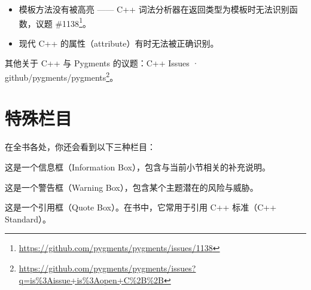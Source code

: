 \begin{itemize}
\item 模板方法没有被高亮 —— C++ 词法分析器在返回类型为模板时无法识别函数，议题 \#1138\footnote{\url{https://github.com/pygments/pygments/issues/1138}}。
\item 现代 C++ 的属性（attribute）有时无法被正确识别。
\end{itemize}

其他关于 C++ 与 Pygments 的议题：C++ Issues · github/pygments/pygments\footnote{\url{https://github.com/pygments/pygments/issues?q=is\%3Aissue+is\%3Aopen+C\%2B\%2B}}。

\section{特殊栏目}

在全书各处，你还会看到以下三种栏目：

\begin{myInfoBox}
这是一个信息框（Information Box），包含与当前小节相关的补充说明。
\end{myInfoBox}

\begin{myWarnBox}
这是一个警告框（Warning Box），包含某个主题潜在的风险与威胁。
\end{myWarnBox}

\begin{myQuote}
这是一个引用框（Quote Box）。在书中，它常用于引用 C++ 标准（C++ Standard）。
\end{myQuote}

